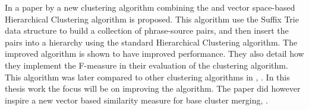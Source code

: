 
In a paper by \cite{Chim2007} a new clustering algorithm combining the \STC and vector space-based Hierarchical Clustering algorithm is proposed. This algorithm use the Suffix Trie data structure to build a collection of phrase-source pairs, and then insert the pairs into a hierarchy using the standard Hierarchical Clustering algorithm. The improved algorithm is shown to have improved performance. They also detail how they implement the F-measure in their evaluation of the clustering algorithm. This algorithm was later compared to other clustering algorithms in , \parencite{Chim2008}. In this thesis work the focus will be on improving the \CTC algorithm. The paper did however inspire a new vector based similarity measure for base cluster merging, \cite{Moe2014}.